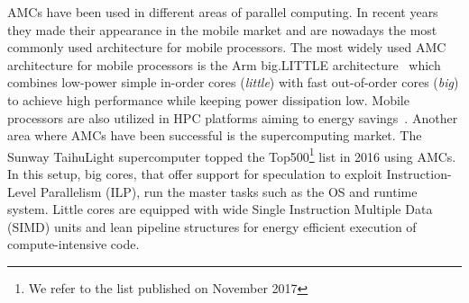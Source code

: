 AMCs have been used in different areas of parallel computing. 
In recent years they made their appearance in the mobile market and are nowadays the most commonly used architecture for mobile processors.
The most widely used AMC architecture for mobile processors is the Arm big.LITTLE architecture~\cite{Greenhalgh2011} which combines low-power simple in-order cores (\emph{little}) with fast out-of-order cores (\emph{big}) to achieve high performance while keeping power dissipation low.
Mobile processors are also utilized in HPC platforms aiming to energy savings~\cite{ARMV8}.
Another area where AMCs have been successful is the supercomputing market.
The Sunway TaihuLight supercomputer topped the Top500\footnote{We refer to the list published on November 2017} list in 2016 using AMCs. 
In this setup, big cores, that offer support for speculation to exploit Instruction-Level Parallelism (ILP), run the master tasks such as the OS and runtime system.
Little cores are equipped with wide Single Instruction Multiple Data (SIMD) units and lean pipeline structures for energy efficient execution of compute-intensive code. 

